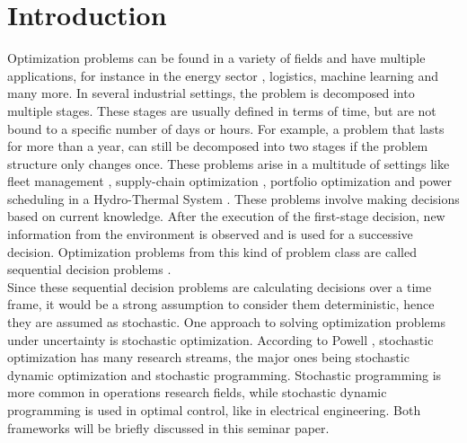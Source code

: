 \section{Introduction} \label{Introdcution}
Optimization problems can be found in a variety of fields and have multiple applications, for instance in the energy sector \cite{PereiraPinto1991}, logistics, machine learning and many more.
In several industrial settings, the problem is decomposed into multiple stages.
These stages are usually defined in terms of time, but are not bound to a specific number of days or hours. For example, a problem that lasts for more than a year, can still be decomposed into two stages if the problem structure only changes once.
These problems arise in a multitude of settings like fleet management \cite{example_powell_fleet_management}, supply-chain optimization \cite{example_supply_chain_optimization}, portfolio optimization \cite{example_portfolio_opt} and power scheduling in a Hydro-Thermal System \cite{example_power_scheduling_Nowak2000}.
These problems involve making decisions based on current knowledge.
After the execution of the first-stage decision, new information from the environment is observed and is used for a successive decision.
Optimization problems from this kind of problem class are called sequential decision problems \cite{Powell_solving_Curses_of_Dimensionality}.\\
Since these sequential decision problems are calculating decisions over a time frame,
it would be a strong assumption to consider them deterministic, hence they are assumed as stochastic.
One approach to solving optimization problems under uncertainty is stochastic optimization.
According to Powell \cite{POWELL2019795,Powell_Clearing_the_Jungle_of_stochastic_Optimization}, stochastic optimization has many research streams, the major ones being stochastic dynamic optimization and stochastic programming.
Stochastic programming is more common in operations research fields, while stochastic dynamic programming is used in optimal control, like in electrical engineering.
Both frameworks will be briefly discussed in this seminar paper.

